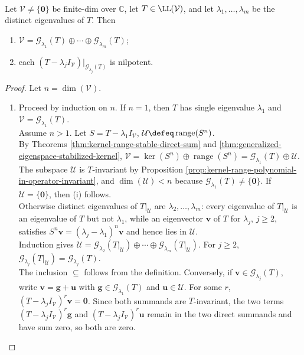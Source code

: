 \begin{theorem} \label{thm:complex-primary-decomposition-generalized-eigenspaces} \\
Let $\mathcal{V}\neq\{\mathbf{0}\}$ be finite-dim over $\mathbb{C}$, let $T\in\LL(\mathcal{V})$, and let $\lambda_1,\ldots,\lambda_m$ be the distinct eigenvalues of $T$. Then
\begin{enumerate}[label=(\roman*)]
\setlength{\itemsep}{0pt}
\item $\mathcal{V}=\mathcal{G}_{\lambda_1}(T)\oplus\cdots\oplus \mathcal{G}_{\lambda_m}(T)$;
\item each $(T-\lambda_jI_{\mathcal{V}})|_{\mathcal{G}_{\lambda_j}(T)}$ is nilpotent.
\end{enumerate}
\begin{proof}
Let $n=\dim(\mathcal{V})$.
\begin{enumerate}[label=(\roman*)]
\setlength{\itemsep}{0pt}
\item
Proceed by induction on $n$. If $n=1$, then $T$ has single eigenvalue $\lambda_1$ and $\mathcal{V}=\mathcal{G}_{\lambda_1}(T)$.\\
Assume $n>1$. Let $S=T-\lambda_1I_{\mathcal{V}}$, $\mathcal{U}\defeq\operatorname{range}(S^n)$.\\
By Theorems \ref{thm:kernel-range-stable-direct-sum} and \ref{thm:generalized-eigenspace-stabilized-kernel}, $\mathcal{V} =\ker(S^n)\oplus\operatorname{range}(S^n) =\mathcal{G}_{\lambda_1}(T)\oplus\mathcal{U}$.
The subspace $\mathcal{U}$ is $T$-invariant by Proposition \ref{prop:kernel-range-polynomial-in-operator-invariant}, and $\dim(\mathcal{U})<n$ because $\mathcal{G}_{\lambda_1}(T)\neq\{\mathbf{0}\}$. If $\mathcal{U}=\{\mathbf{0}\}$, then (i) follows.\\
Otherwise distinct eigenvalues of $T|_{\mathcal{U}}$ are $\lambda_2,\ldots,\lambda_m$: every eigenvalue of $T|_{\mathcal{U}}$ is an eigenvalue of $T$ but not $\lambda_1$, while an eigenvector $\mathbf{v}$ of $T$ for $\lambda_j$, $j\geq2$, satisfies $S^n\mathbf{v}=(\lambda_j-\lambda_1)^n\mathbf{v}$ and hence lies in $\mathcal{U}$.\\
Induction gives $\mathcal{U} =\mathcal{G}_{\lambda_2}(T|_{\mathcal{U}})\oplus\cdots\oplus \mathcal{G}_{\lambda_m}(T|_{\mathcal{U}})$. For $j\geq2$, $\mathcal{G}_{\lambda_j}(T|_{\mathcal{U}})=\mathcal{G}_{\lambda_j}(T)$.\\
The inclusion $\subseteq$ follows from the definition. Conversely, if $\mathbf{v}\in\mathcal{G}_{\lambda_j}(T)$, write $\mathbf{v}=\mathbf{g}+\mathbf{u}$ with $\mathbf{g}\in\mathcal{G}_{\lambda_1}(T)$ and $\mathbf{u}\in\mathcal{U}$. For some $r$, $(T-\lambda_jI_{\mathcal{V}})^r\mathbf{v}=\mathbf{0}$. Since both summands are $T$-invariant, the two terms $(T-\lambda_jI_{\mathcal{V}})^r\mathbf{g}$ and $(T-\lambda_jI_{\mathcal{V}})^r\mathbf{u}$ remain in the two direct summands and have sum zero, so both are zero.\\

\end{enumerate}
\end{proof}
\end{theorem}
